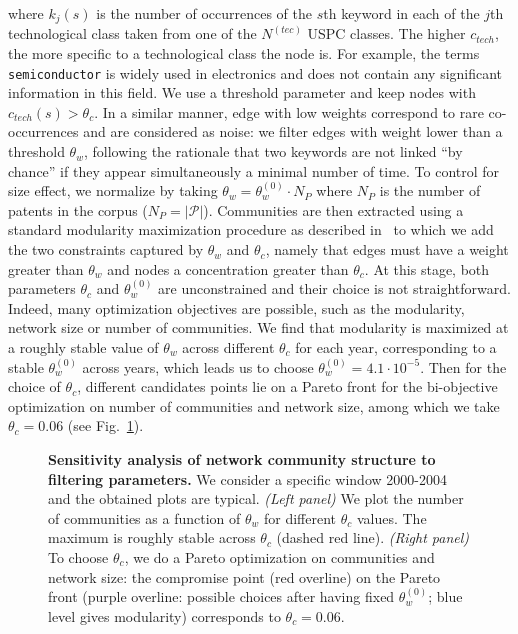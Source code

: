 \documentclass[10pt,A4,draft]{article}
\begin{document}
where $k_j(s)$ is the number of occurrences of the $s$th keyword in each of the $j$th technological class taken from one of the $N^{(tec)}$ USPC classes. The higher $c_{tech}$, the more specific to a technological class the node is. For example, the terms \texttt{semiconductor} is widely used in electronics and does not contain any significant information in this field. We use a threshold parameter and keep nodes with $c_{tech}(s) > \theta_c$. In a similar manner, edge with low weights correspond to rare co-occurrences and are considered as noise: we filter edges with weight lower than a threshold $\theta_w$, following the rationale that two keywords are not linked ``by chance'' if they appear simultaneously a minimal number of time. To control for size effect, we normalize by taking $\theta_w = \theta_w^{(0)}\cdot N_P$ where $N_P$ is the number of patents in the corpus ($N_P = \left|\mathcal{P} \right|$). Communities are then extracted using a standard modularity maximization procedure as described in~\cite{clauset2004finding} to which we add the two constraints captured by $\theta_w$ and $\theta_c$, namely that edges must have a weight greater than $\theta_w$ and nodes a concentration greater than $\theta_c$. At this stage, both parameters $\theta_c$ and $\theta_w^{(0)}$ are unconstrained and their choice is not straightforward. Indeed, many optimization objectives are possible, such as the modularity, network size or number of communities. We find that modularity is maximized at a roughly stable value of $\theta_w$ across different $\theta_c$ for each year, corresponding to a stable $\theta_w^{(0)}$ across years, which leads us to choose $\theta_w^{(0)} = 4.1\cdot 10^{-5}$. Then for the choice of $\theta_c$, different candidates points lie on a Pareto front for the bi-objective optimization on number of communities and network size, among which we take $\theta_c = 0.06$ (see Fig.~\ref{fig:networksensitivity}).


\begin{figure}
\centering
\caption{\textbf{Sensitivity analysis of network community structure to filtering parameters.} We consider a specific window 2000-2004 and the obtained plots are typical. \textit{(Left panel)} We plot the number of communities as a function of $\theta_w$ for different $\theta_c$ values. The maximum is roughly stable across $\theta_c$ (dashed red line). \textit{(Right panel)} To choose $\theta_c$, we do a Pareto optimization on communities and network size: the compromise point (red overline) on the Pareto front (purple overline: possible choices after having fixed $\theta_w^{(0)}$; blue level gives modularity) corresponds to $\theta_c = 0.06$.}
\label{fig:networksensitivity}
\end{figure}
\end{document}
